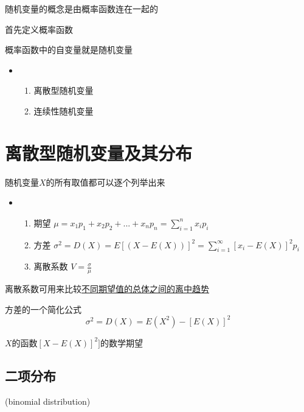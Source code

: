 \documentclass[UTF8,10pt]{book}
\begin{document}
                {\kaishu 随机变量的概念是由概率函数连在一起的
                
                首先定义概率函数
                
                概率函数中的自变量就是随机变量
                }

                \begin{itemize}
                    \item [] {
                        \begin{enumerate}
                            \item 离散型随机变量
                            \item 连续性随机变量
                        \end{enumerate}
                    }
                \end{itemize}


    \section{离散型随机变量及其分布}
                {\kaishu 随机变量$X$的所有取值都可以逐个列举出来}

            \begin{itemize}
                    \item [] {
                        \begin{enumerate}
                            \item 期望 $ \mu = x_1p_1+x_2p_2+...+x_np_n=\sum_{i=1}^n x_ip_i $
                            \item 方差 $ \sigma^2 = D(X) = E[(X-E(X))]^2 = \sum_{i=1}^{\infty}[x_i-E(X)]^2p_i $
                            \item 离散系数 $ V = \frac{\sigma}{\mu} $
                        \end{enumerate}
                    }
                \end{itemize}

            {\kaishu 离散系数可用来比较\underline{不同期望值的总体之间的离中趋势}}

            {\kaishu 方差的一个简化公式}
                $$ \sigma^2 = D(X) = E(X^2) - [E(X)]^2 $$

            {$X$的函数$[X-E(X)]^2]$的数学期望}

        \subsection{二项分布}
                (binomial distribution)
\end{document}
